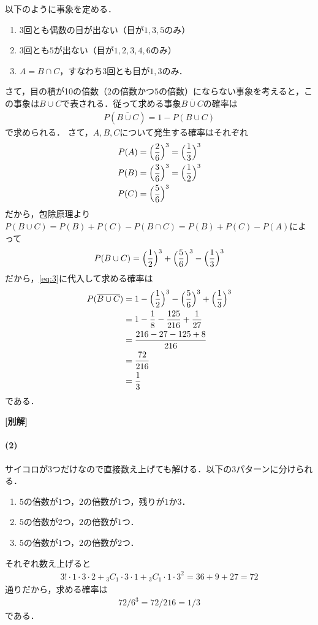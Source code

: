 \documentclass[../../main.tex]{subfiles}
\begin{document}
以下のように事象を定める．
\begin{enumerate}
  \item[$B$] 3回とも偶数の目が出ない（目が$1,3,5$のみ）
  \item[$C$] 3回とも$5$が出ない（目が$1,2,3,4,6$のみ）
  \item[$A$] $A=B\cap C$，すなわち3回とも目が$1,3$のみ．
\end{enumerate}
さて，目の積が10の倍数（$2$の倍数かつ$5$の倍数）にならない事象を考えると，この事象は$B\cup C$で表される．従って求める事象$\overline{B\cup C}$の確率は
\begin{align}
  P(\overline{B\cup C}) = 1 - P(B\cup C) \label{eq:3}
\end{align}
で求められる．
さて，$A,B,C$について発生する確率はそれぞれ
\begin{align}
  P(A)&=\Bigl(\dfrac{2}{6}\Bigr)^3=\Bigl(\dfrac{1}{3}\Bigr)^3 \\
  P(B)&=\Bigl(\dfrac{3}{6}\Bigr)^3=\Bigl(\dfrac{1}{2}\Bigr)^3 \\
  P(C)&=\Bigl(\dfrac{5}{6}\Bigr)^3
\end{align}
だから，包除原理より$P(B\cup C)=P(B)+P(C)-P(B\cap C)=P(B)+P(C)-P(A)$によって
\begin{align}
  P(B\cup C) = \Bigl(\dfrac{1}{2}\Bigr)^3 + \Bigl(\dfrac{5}{6}\Bigr)^3 - \Bigl(\dfrac{1}{3}\Bigr)^3
\end{align}
だから，\cref{eq:3}に代入して求める確率は
\begin{align}
  P(\overline{B\cup C})
  &=1-\Bigl(\dfrac{1}{2}\Bigr)^3-\Bigl(\dfrac{5}{6}\Bigr)^3+\Bigl(\dfrac{1}{3}\Bigr)^3 \\
  &=1-\dfrac{1}{8}-\dfrac{125}{216}+\dfrac{1}{27} \\
  &=\dfrac{216-27-125+8}{216} \\
  &=\dfrac{72}{216} \\
  &=\dfrac{1}{3}
\end{align}
である．

{\bf [別解]}

\paragraph{(2)}

サイコロが$3$つだけなので直接数え上げても解ける．以下の3パターンに分けられる．
\begin{enumerate}
  \item $5$の倍数が$1$つ，$2$の倍数が$1$つ，残りが$1$か$3$．
  \item $5$の倍数が$2$つ，$2$の倍数が$1$つ．
  \item $5$の倍数が$1$つ，$2$の倍数が$2$つ．
\end{enumerate}
それぞれ数え上げると
\begin{align}
  3!\cdot1\cdot3\cdot2 + {}_3C_1\cdot3\cdot1 + {}_3C_1\cdot1\cdot3^2 = 36 + 9 + 27 = 72
\end{align}
通りだから，求める確率は
\begin{align}
  72/6^3=72/216=1/3
\end{align}
である．

\newpage
\end{document}

